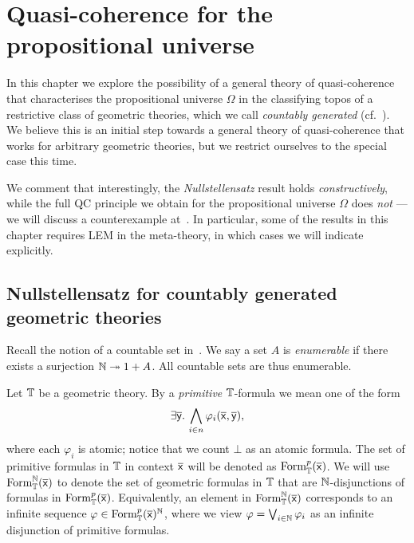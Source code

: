 \NewDocumentCommand{}
\NewDocumentCommand{}


\chapter{Quasi-coherence for the propositional universe}\label{ch:sqcforomega}

In this chapter we explore the possibility of a general theory of quasi-coherence that characterises the propositional universe $\Omega$ in the classifying topos of a restrictive class of geometric theories, which we call \emph{countably generated} (cf.~). We believe this is an initial step towards a general theory of quasi-coherence that works for arbitrary geometric theories, but we restrict ourselves to the special case this time.

We comment that interestingly, the \emph{Nullstellensatz} result holds \emph{constructively}, while the full \gls{QC} principle we obtain for the propositional universe $\Omega$ does \emph{not} --- we will discuss a counterexample at~. In particular, some of the results in this chapter requires \gls{LEM} in the meta-theory, in which cases we will indicate explicitly. 

\section{Nullstellensatz for countably generated geometric theories}

Recall the notion of a countable set in~. We say a set $A$ is \emph{enumerable} if there exists a surjection $\mathbb{N} \twoheadrightarrow 1 + A$. All countable sets are thus enumerable.

Let $\mathbb{T}$ be a geometric theory. By a \emph{primitive} $\mathbb{T}$-formula we mean one of the form 
\[ \exists\overline{\mathsf{y}}.\,\bigwedge_{i\in n}\varphi_i(\overline{\mathsf{x}},\overline{\mathsf{y}}), \]
where each $\varphi_i$ is atomic; notice that we count $\bot$ as an atomic formula. The set of primitive formulas in $\mathbb{T}$ in context $\overline{\mathsf{x}}$ will be denoted as $\mathrm{Form}^p_{\mathbb{T}}(\overline{\mathsf{x}})$. We will use $\mathrm{Form}^{\mathbb{N}}_{\mathbb{T}}(\overline{\mathsf{x}})$ to denote the set of geometric formulas in $\mathbb{T}$ that are $\mathbb{N}$-disjunctions of formulas in $\mathrm{Form}^p_{\mathbb{T}}(\overline{\mathsf{x}})$. Equivalently, an element in $\mathrm{Form}^{\mathbb{N}}_{\mathbb{T}}(\overline{\mathsf{x}})$ corresponds to an infinite sequence $\varphi \in \mathrm{Form}^p_{\mathbb{T}}(\overline{\mathsf{x}})^{\mathbb{N}}$, where we view $\varphi = \bigvee_{i\in\mathbb{N}}\varphi_i$ as an infinite disjunction of primitive formulas. 


